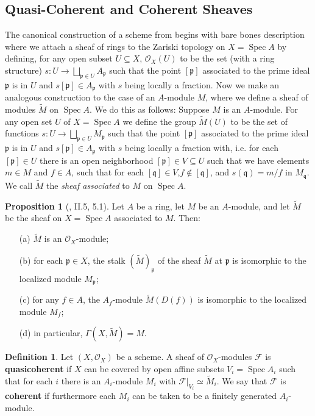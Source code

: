 \documentclass[oneside]{amsart}
\theoremstyle{definition}
\newtheorem{defi}{Definition}[section]
\newtheorem{prop}{Proposition}[section]
\DeclareMathOperator{\spec}{Spec}
\newcommand{\p}{\mathfrak p}
\begin{document}
\subsection{Quasi-Coherent and Coherent Sheaves}
The canonical construction of a scheme from  begins with bare bones description where we attach a sheaf of rings to the Zariski topology on  $X = \spec A$ by defining, for any open subset $U \subseteq X$, $\mathscr O _X(U)$ to be the set (with a ring structure) $s \colon U \to \bigsqcup_{\p \in U}A_{\p}$ such that the point $[ \p ]$ associated to the prime ideal $\p$ is  in $U$ and $s[\p] \in A_{\p}$ with $s$ being locally a fraction. Now we make an analogous construction to the case of an $A$-module $M$, where we define a sheaf of modules $\widetilde{M}$ on $\spec A$. We do this as follows: Suppose $M$ is an $A$-module. For any open set $U$ of $X =\spec A$ we define the group $\widetilde{M} (U)$ to be the set of functions $s \colon U \to \bigsqcup_{\p \in U}M_{\p}$ such that the point $[ \p ]$ associated to the prime ideal $\p$ is  in $U$ and $s[\p] \in A_{\p}$ with $s$ being locally a fraction with, i.e. for each $[\p] \in U$ there is an open neighborhood $[\p] \in V \subseteq U$ such that we have elements $m \in M$ and $f \in A$, such that for each $[ \mathfrak q] \in V$,$f \notin [\mathfrak q]$, and $s(\mathfrak q)= m/f$ in $M_\mathfrak q$. We call $\widetilde{M}$ the \textit{sheaf associated} to $M$ on $\spec A$.
\begin{prop}[, II.5, 5.1]
	Let $A$ be a ring, let $M$ be an $A$-module, and let $\widetilde{M}$ be the sheaf on $X =\spec A$ associated to $M$. Then: 
	\begin{itemize}
		\item[ (a)] $\widetilde{M}$ is an $\mathscr O _X$-module;
		\item[(b)] for each $\p \in X$, the stalk $(\widetilde{M})_{\p}$ of the sheaf $\widetilde{M}$ at $\p$ is isomorphic to the localized module $M_{\p}$;
		\item[(c)] for any $f \in A$, the $A_f$-module $\widetilde{M}(D(f))$ is isomorphic to the localized module $M_f$;
		\item[(d)] in particular, $\Gamma(X, \widetilde{M}) = M$.
	\end{itemize}
\end{prop}
\begin{defi}
Let $(X, \mathscr O_X)$ be a scheme. A sheaf of $\mathscr O_X$-modules $\mathscr F$ is \textbf{quasicoherent} if $X$ can be covered by open affine subsets $V_i = \spec A_i$ such that for each $i$ there is an $A_i$-module $M_i$ with $\mathscr F | _{V_i} \simeq \widetilde{M}_i$. We say that $\mathscr F$ is \textbf{coherent} if furthermore each $M_i$ can be taken to be a finitely generated $A_i$-module. 
\end{defi}
\end{document}
